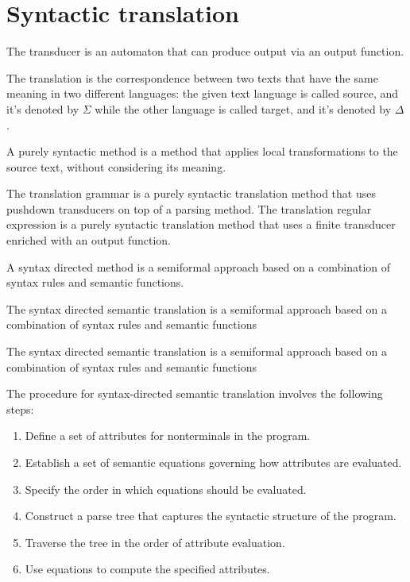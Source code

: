 \section{Syntactic translation}

\begin{definition}
    The transducer is an automaton that can produce output via an output function. 
\end{definition}
\begin{definition}
    The translation is the correspondence between two texts that have the same meaning in two different languages: the given text language is called source, and it's denoted by $\Sigma$ while the other language is called target, and it's denoted by $\Delta$. 
\end{definition}
\begin{definition}
    A purely syntactic method is a method that applies local transformations to the source text, without considering its meaning. 
\end{definition}
The translation grammar is a purely syntactic translation method that uses pushdown transducers on top of a parsing method. 
The translation regular expression is a purely syntactic translation method that uses a finite transducer enriched with an output function. 
\begin{definition}
    A syntax directed method is a semiformal approach based on a combination of syntax rules and semantic functions. 
\end{definition}
\begin{definition}
    The syntax directed semantic translation is a semiformal approach based on a combination of syntax rules and semantic functions
\end{definition}
\begin{definition}
  The syntax directed semantic translation is a semiformal approach based on a combination of syntax rules and semantic functions
\end{definition}
The procedure for syntax-directed semantic translation involves the following steps:
\begin{enumerate}
    \item Define a set of attributes for nonterminals in the program.
    \item Establish a set of semantic equations governing how attributes are evaluated.
    \item Specify the order in which equations should be evaluated.
    \item Construct a parse tree that captures the syntactic structure of the program.
    \item Traverse the tree in the order of attribute evaluation.
    \item Use equations to compute the specified attributes.
\end{enumerate}

